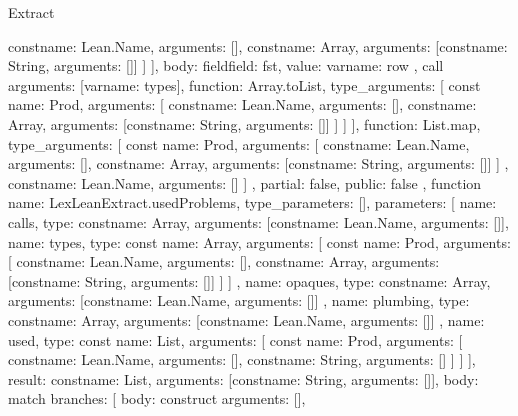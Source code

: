 \begin{lexlean}{Extract}
\begin{toolingmodule}
{{{{{{{                      const{name: Lean.Name, arguments: []},
                      const{name: Array, arguments: [const{name: String, arguments: []}]}
                    ]
                  }
                }
              ],
              body: field{field: fst, value: var{name: row}}
            },
            call{
              arguments: [var{name: types}],
              function: Array.toList,
              type_arguments: [
                const{
                  name: Prod,
                  arguments: [
                    const{name: Lean.Name, arguments: []},
                    const{name: Array, arguments: [const{name: String, arguments: []}]}
                  ]
                }
              ]
            }
          ],
          function: List.map,
          type_arguments: [
            const{
              name: Prod,
              arguments: [
                const{name: Lean.Name, arguments: []},
                const{name: Array, arguments: [const{name: String, arguments: []}]}
              ]
            },
            const{name: Lean.Name, arguments: []}
          ]
        }
      },
      partial: false,
      public: false
    },
    function{
      name: LexLeanExtract.usedProblems,
      type_parameters: [],
      parameters: [
        {name: calls, type: const{name: Array, arguments: [const{name: Lean.Name, arguments: []}]}},
        {
          name: types,
          type: const{
            name: Array,
            arguments: [
              const{
                name: Prod,
                arguments: [
                  const{name: Lean.Name, arguments: []},
                  const{name: Array, arguments: [const{name: String, arguments: []}]}
                ]
              }
            ]
          }
        },
        {
          name: opaques,
          type: const{name: Array, arguments: [const{name: Lean.Name, arguments: []}]}
        },
        {
          name: plumbing,
          type: const{name: Array, arguments: [const{name: Lean.Name, arguments: []}]}
        },
        {
          name: used,
          type: const{
            name: List,
            arguments: [
              const{
                name: Prod,
                arguments: [
                  const{name: Lean.Name, arguments: []},
                  const{name: String, arguments: []}
                ]
              }
            ]
          }
        }
      ],
      result: const{name: List, arguments: [const{name: String, arguments: []}]},
      body: match{
        branches: [
          {
            body: construct{
              arguments: [],
}}}}}
\end{toolingmodule}
\end{lexlean}

